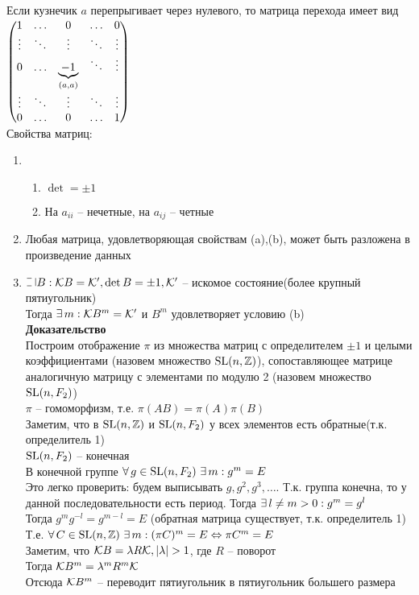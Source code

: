 \documentclass[12pt]{article}
\begin{document}
Если кузнечик $a$ перепрыгивает через нулевого, то матрица перехода имеет вид 
$\begin{pmatrix}
    1 & \ldots & 0 & \ldots & 0\\
    \vdots & \ddots & \vdots & \ddots & \vdots\\
    0 & \ldots & \ub{(a, a)}{-1} & \ddots & \vdots\\
    \vdots & \ddots & \vdots & \ddots & \vdots\\
    0 & \ldots & 0 & \ldots & 1\\
\end{pmatrix}$\\
Свойства матриц:
\begin{enumerate}
    \item \begin{enumerate}
        \item $\det = \pm 1$
        \item На $a_{ii}$ -- нечетные, на $a_{ij}$ -- четные
    \end{enumerate}
    \item Любая матрица, удовлетворяющая свойствам (a),(b), может быть разложена в произведение данных
    \item $\letus B: \mc K B = \mc K', \det B = \pm 1, \mc K'$ -- искомое состояние(более крупный пятиугольник)\\
    Тогда $\ex m: \mc K B^m = \mc K'$ и $B^m$ удовлетворяет условию (b)\\
    \textbf{Доказательство}\\
    Построим отображение $\pi$ из множества матриц с определителем $\pm 1$ и целыми коэффициентами (назовем множество $\nm{SL}(n, \Zset)$), сопоставляющее матрице аналогичную матрицу с элементами по модулю 2 (назовем множество $\nm{SL}(n, F_2)$)\\
    $\pi$ -- гомоморфизм, т.е. $\pi(AB) = \pi(A)\pi(B)$\\
    Заметим, что в $\nm{SL}(n, \Zset)$ и $\nm{SL}(n, F_2)$ у всех элементов есть обратные(т.к. определитель 1)\\
    $\nm{SL}(n, F_2)$ -- конечная\\
    В конечной группе $\fall g\in \nm{SL}(n, F_2)\ \ex m: g^m = E$\\
    Это легко проверить: будем выписывать $g, g^2, g^3, \ldots$. Т.к. группа конечна, то у данной последовательности есть период. Тогда $\ex l \neq m > 0: g^m = g^l$\\
    Тогда $g^mg^{-l}=g^{m-l} = E$ (обратная матрица существует, т.к. определитель 1)\\
    Т.е. $\fall C \in \nm{SL}(n, \Zset)\ \ex m: (\pi C)^m = E \LRto \pi C^m = E$\\
    Заметим, что $\mc K B = \lambda R \mc K, |\lambda| > 1$, где $R$ -- поворот\\
    Тогда $\mc K B^m = \lambda^m R^m \mc K$\\
    Отсюда $\mc K B^m$ -- переводит пятиугольник в пятиугольник большего размера
\end{enumerate}
\end{document}

